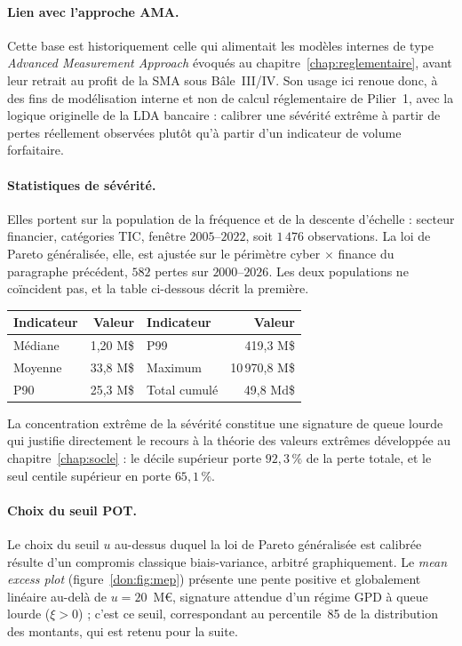 \paragraph{Lien avec l'approche AMA.} Cette base est historiquement celle
qui alimentait les modèles internes de type \emph{Advanced Measurement
Approach} évoqués au chapitre~\ref{chap:reglementaire}, avant leur retrait au profit de la SMA sous
Bâle~III/IV. Son usage ici renoue donc, à des fins de modélisation interne et
non de calcul réglementaire de Pilier~1, avec la logique originelle de la LDA
bancaire : calibrer une sévérité extrême à partir de pertes réellement
observées plutôt qu'à partir d'un indicateur de volume forfaitaire.

\paragraph{Statistiques de sévérité.} Elles portent sur la population de la fréquence et de la
descente d'échelle : secteur financier, catégories TIC, fenêtre $2005$--$2022$, soit
$1\,476$ observations. La loi de Pareto généralisée, elle, est ajustée sur le périmètre cyber
$\times$ finance du paragraphe précédent, $582$ pertes sur $2000$--$2026$. Les deux populations
ne coïncident pas, et la table ci-dessous décrit la première.

\begin{center}
\renewcommand{\arraystretch}{1.3}
\begin{tabular}{l r l r}
\toprule
\rowcolor{lightblue}
\textbf{Indicateur} & \textbf{Valeur} & \textbf{Indicateur} & \textbf{Valeur} \\
\midrule
Médiane & 1{,}20 M\$ & P99 & 419{,}3 M\$ \\
Moyenne & 33{,}8 M\$ & Maximum & 10\,970{,}8 M\$ \\
P90 & 25{,}3 M\$ & Total cumulé & 49{,}8 Md\$ \\
\bottomrule
\end{tabular}
\end{center}

La concentration extrême de la sévérité constitue une signature de queue lourde qui justifie
directement le recours à la théorie des valeurs extrêmes développée au
chapitre~\ref{chap:socle} : le décile supérieur porte $92{,}3\,\%$ de la perte totale, et le
seul centile supérieur en porte $65{,}1\,\%$.


\paragraph{Choix du seuil POT.} Le choix du seuil $u$ au-dessus duquel la loi
de Pareto généralisée est calibrée résulte d'un compromis classique
biais-variance, arbitré graphiquement. Le \emph{mean excess plot}
(figure~\ref{don:fig:mep}) présente une pente positive et globalement linéaire
au-delà de $u = 20$~M\euro, signature attendue d'un régime GPD à queue lourde
($\xi > 0$) ; c'est ce seuil, correspondant au percentile~85 de la
distribution des montants, qui est retenu pour la suite.

